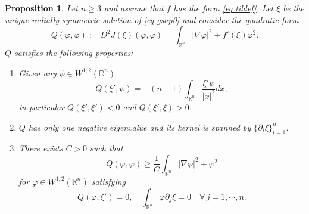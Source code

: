 \documentclass[11pt,letterpaper,reqno]{amsart}
\newcommand{\R}{\mathbb{R}}
\theoremstyle{plain}%
\newtheorem{proposition}[theorem]{Proposition}
\theoremstyle{definition}
\numberwithin{equation}{section}
\numberwithin{figure}{section}
\begin{document}
\begin{proposition}\label{thm nondegneracy}
    Let $n\geq 3$ and assume that $f$ has the form \eqref{eq tildef}. Let $\xi$ be the unique radially symmetric solution of \eqref{eq gsap0} and consider the quadratic form
    \begin{equation*}
         Q(\varphi, \varphi):=  D^2J(\xi)(\varphi, \varphi)=\int_{\R^n} |\nabla \varphi|^2+f'(\xi)\varphi^2.
    \end{equation*}
    $Q$ satisfies the following properties:
    \begin{enumerate}
        \item Given any $\psi \in W^{1,2}(\R^n)$
          \begin{equation}\label{eq svxi'}
        Q(\xi', \psi)= - (n-1) \int_{\R^n} \frac{\xi' \psi}{|x|^2}dx,
    \end{equation}
    in particular $Q(\xi', \xi') <0$ and $Q(\xi', \xi)>0$.
        \item $Q$ has only one negative eigenvalue and its kernel is spanned by $\{\partial_i \xi\}_{i=1}^n$. 
        \item There exists $C>0$ such that 
        \begin{equation}\label{eq nondegJ}
      Q(\varphi, \varphi) \geq \frac{1}{C} \int_{\R^n} |\nabla \varphi|^2 +\varphi^2
    \end{equation}
    for $\varphi \in W^{1,2}(\R^n)$ satisfying
    \begin{equation}\label{eq orthoJ}
      Q(\varphi, \xi') =0, \quad \int_{\R^n} \varphi \partial_j \xi =0 \quad \forall \, j=1, \cdots , n.
    \end{equation}
    \end{enumerate}    
\end{proposition}
\end{document}
